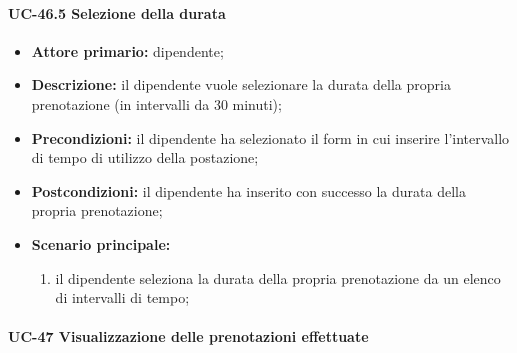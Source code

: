 \paragraph{UC-46.5 Selezione della durata}

    \begin{itemize}
        \item \textbf{Attore primario:} dipendente;

        \item \textbf{Descrizione:} il dipendente vuole selezionare la durata della propria prenotazione (in intervalli da 30 minuti);

        \item \textbf{Precondizioni:} il dipendente ha selezionato il form in cui inserire l'intervallo di tempo di utilizzo della postazione;

        \item \textbf{Postcondizioni:} il dipendente ha inserito con successo la durata della propria prenotazione;

        \item \textbf{Scenario principale:}
            \begin{enumerate}
                \item il dipendente seleziona la durata della propria prenotazione da un elenco di intervalli di tempo;
            \end{enumerate}
    \end{itemize}
  
\paragraph{UC-47 Visualizzazione delle prenotazioni effettuate}

